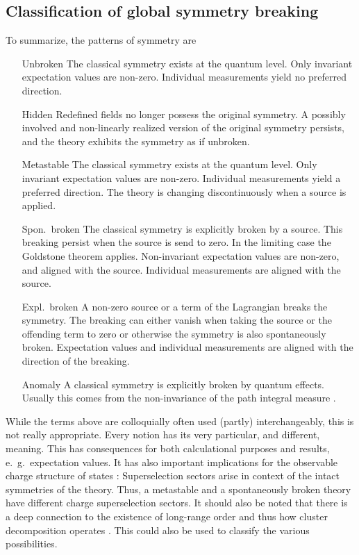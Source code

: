 \documentclass[final,12pt]{article}
\newcommand*{\1}{1\!\!\!\bot}
\begin{document}
\subsection{Classification of global symmetry breaking}\label{ss:classificationsb}

To summarize, the patterns of symmetry are
\begin{itemize}[leftmargin=0.1\textwidth]
 \item[Unbroken] The classical symmetry exists at the quantum level. Only invariant expectation values are non-zero. Individual measurements yield no preferred direction.
 \item[Hidden] Redefined fields no longer possess the original symmetry. A possibly involved and non-linearly realized version of the original symmetry persists, and the theory exhibits the symmetry as if unbroken.
 \item[Metastable] The classical symmetry exists at the quantum level. Only invariant expectation values are non-zero. Individual measurements yield a preferred direction. The theory is changing discontinuously when a source is applied.
 \item[Spon.\ broken] The classical symmetry is explicitly broken by a source. This breaking persist when the source is send to zero. In the limiting case the Goldstone theorem applies. Non-invariant expectation values are non-zero, and aligned with the source. Individual measurements are aligned with the source.
 \item[Expl.\ broken] A non-zero source or a term of the Lagrangian breaks the symmetry. The breaking can either vanish when taking the source or the offending term to zero or otherwise the symmetry is also spontaneously broken. Expectation values and individual measurements are aligned with the direction of the breaking.
 \item[Anomaly] A classical symmetry is explicitly broken by quantum effects. Usually this comes from the non-invariance of the path integral measure \cite{Bertlmann:1996xk}.
\end{itemize}
While the terms above are colloquially often used (partly) interchangeably, this is not really appropriate. Every notion has its very particular, and different, meaning. This has consequences for both calculational purposes and results, e.\ g.\ expectation values. It has also important implications for the observable charge structure of states \cite{Strocchi:2005yk}: Superselection sectors arise in context of the intact symmetries of the theory. Thus, a metastable and a spontaneously broken theory have different charge superselection sectors. It should also be noted that there is a deep connection to the existence of long-range order and thus how cluster decomposition operates \cite{Weinberg:1996kr}. This could also be used to classify the various possibilities.
\end{document}
